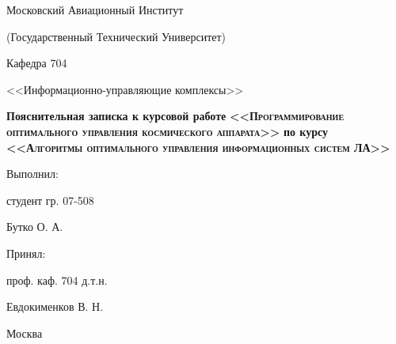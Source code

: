 \begin{titlepage}
\newpage
{}
\begin{center}
Московский Авиационный Институт

(Государственный Технический Университет)
\end{center}

\vspace{4em}

\begin{center}
    \LARGE Кафедра 704

    <<Информационно-управляющие комплексы>>
\end{center}

\vspace{2em}

\begin{center}
\textbf{Пояснительная записка к курсовой работе}
\Large \textsc{\textbf{
\lb
<<Программирование оптимального
управления космического аппарата>>}}
\lb\lb
\textbf{по курсу}
\lb\lb
\Large \textsc{\textbf{
<<Алгоритмы оптимального управления
информационных систем ЛА>>
}}
\end{center}

\vspace{6em}

\begin{flushright}
Выполнил: 

студент гр. 07-508

Бутко О. А.

\vspace{1em}

Принял:

проф. каф. 704 д.т.н. 

Евдокименков В. Н.

\end{flushright}

\vspace{\fill}

\begin{center}
    Москва
\end{center}

\end{titlepage}
